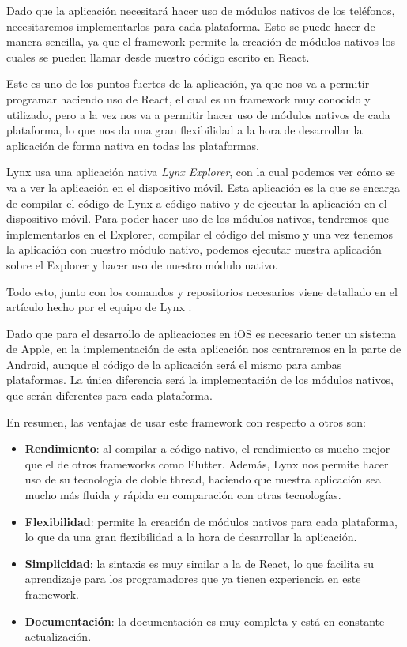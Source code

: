 Dado que la aplicación necesitará hacer uso de módulos nativos de los teléfonos, necesitaremos implementarlos para cada plataforma.
Esto se puede hacer de manera sencilla, ya que el framework permite la creación de módulos nativos los cuales se pueden llamar desde nuestro código escrito en React.

Este es uno de los puntos fuertes de la aplicación, ya que nos va a permitir programar haciendo uso de React, el cual es un framework muy conocido y utilizado, pero a la vez nos va a permitir hacer uso de módulos nativos de cada plataforma, lo que nos da una gran flexibilidad a la hora de desarrollar la aplicación de forma nativa en todas las plataformas.

Lynx usa una aplicación nativa \textit{Lynx Explorer}, con la cual podemos ver cómo se va a ver la aplicación en el dispositivo móvil. Esta aplicación es la que se encarga de compilar el código de Lynx a código nativo y de ejecutar la aplicación en el dispositivo móvil.
Para poder hacer uso de los módulos nativos, tendremos que implementarlos en el Explorer, compilar el código del mismo y una vez tenemos la aplicación con nuestro módulo nativo, podemos ejecutar nuestra aplicación sobre el Explorer y hacer uso de nuestro módulo nativo.

Todo esto, junto con los comandos y repositorios necesarios viene detallado en el artículo hecho por el equipo de Lynx \parencite{lynx-native-modules}.

Dado que para el desarrollo de aplicaciones en iOS es necesario tener un sistema de Apple, en la implementación de esta aplicación nos centraremos en la parte de Android, aunque el código de la aplicación será el mismo para ambas plataformas.
La única diferencia será la implementación de los módulos nativos, que serán diferentes para cada plataforma.

En resumen, las ventajas de usar este framework con respecto a otros son:
\begin{itemize}
    \item \textbf{Rendimiento}: al compilar a código nativo, el rendimiento es mucho mejor que el de otros frameworks como Flutter. Además, Lynx nos permite hacer uso de su tecnología de doble thread, haciendo que nuestra aplicación sea mucho más fluida y rápida en comparación con otras tecnologías.
    \item \textbf{Flexibilidad}: permite la creación de módulos nativos para cada plataforma, lo que da una gran flexibilidad a la hora de desarrollar la aplicación.
    \item \textbf{Simplicidad}: la sintaxis es muy similar a la de React, lo que facilita su aprendizaje para los programadores que ya tienen experiencia en este framework.
    \item \textbf{Documentación}: la documentación es muy completa y está en constante actualización.
\end{itemize}

